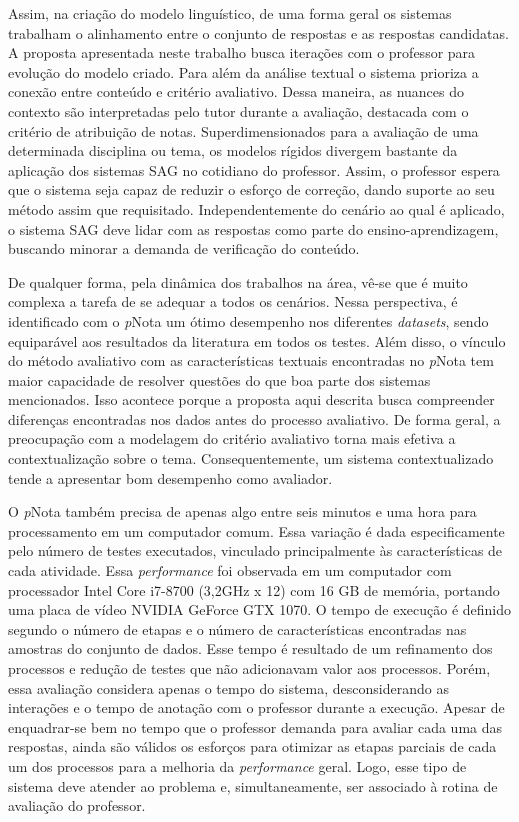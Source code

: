 Assim, na criação do modelo linguístico, de uma forma geral os sistemas trabalham o alinhamento entre o conjunto de respostas e as respostas candidatas. A proposta apresentada neste trabalho busca iterações com o professor para evolução do modelo criado. Para além da análise textual o sistema prioriza a conexão entre conteúdo e critério avaliativo. Dessa maneira, as nuances do contexto são interpretadas pelo tutor durante a avaliação, destacada com o critério de atribuição de notas. Superdimensionados para a avaliação de uma determinada disciplina ou tema, os modelos rígidos divergem bastante da aplicação dos sistemas SAG no cotidiano do professor. Assim, o professor espera que o sistema seja capaz de reduzir o esforço de correção, dando suporte ao seu método assim que requisitado. Independentemente do cenário ao qual é aplicado, o sistema SAG deve lidar com as respostas como parte do ensino-aprendizagem, buscando minorar a demanda de verificação do conteúdo.

De qualquer forma, pela dinâmica dos trabalhos na área, vê-se que é muito complexa a tarefa de se adequar a todos os cenários. Nessa perspectiva, é identificado com o \textit{p}Nota um ótimo desempenho nos diferentes \textit{datasets}, sendo equiparável aos resultados da literatura em todos os testes. Além disso, o vínculo do método avaliativo com as características textuais encontradas no \textit{p}Nota tem maior capacidade de resolver questões do que boa parte dos sistemas mencionados. Isso acontece porque a proposta aqui descrita busca compreender diferenças encontradas nos dados antes do processo avaliativo. De forma geral, a preocupação com a modelagem do critério avaliativo torna mais efetiva a contextualização sobre o tema. Consequentemente, um sistema contextualizado tende a apresentar bom desempenho como avaliador.

O \textit{p}Nota também precisa de apenas algo entre seis minutos e uma hora para processamento em um computador comum. Essa variação é dada especificamente pelo número de testes executados, vinculado principalmente às características de cada atividade. Essa \textit{performance} foi observada em um computador com processador Intel Core i7-8700 (3,2GHz x 12) com 16 GB de memória, portando uma placa de vídeo NVIDIA GeForce GTX 1070. O tempo de execução é definido segundo o número de etapas e o número de características encontradas nas amostras do conjunto de dados. Esse tempo é resultado de um refinamento dos processos e redução de testes que não adicionavam valor aos processos. Porém, essa avaliação considera apenas o tempo do sistema, desconsiderando as interações e o tempo de anotação com o professor durante a execução. Apesar de enquadrar-se bem no tempo que o professor demanda para avaliar cada uma das respostas, ainda são válidos os esforços para otimizar as etapas parciais de cada um dos processos para a melhoria da \textit{performance} geral. Logo, esse tipo de sistema deve atender ao problema e, simultaneamente, ser associado à rotina de avaliação do professor.

